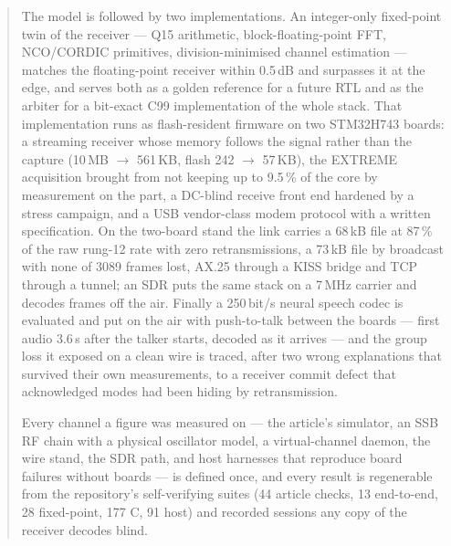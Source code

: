 \documentclass[12pt,a4paper]{article}
\begin{document}
\begin{abstract}
The model is followed by two implementations.  An integer-only
fixed-point twin of the receiver --- Q15 arithmetic,
block-floating-point FFT, NCO/CORDIC primitives, division-minimised
channel estimation --- matches the floating-point receiver within
0.5\,dB and surpasses it at the edge, and serves both as a golden
reference for a future RTL and as the arbiter for a bit-exact C99
implementation of the whole stack.  That implementation runs as
flash-resident firmware on two STM32H743 boards: a streaming receiver
whose memory follows the signal rather than the capture (10\,MB
$\to$ 561\,KB, flash 242 $\to$ 57\,KB), the EXTREME acquisition
brought from not keeping up to 9.5\,\% of the core by measurement on
the part, a DC-blind receive front end hardened by a stress campaign,
and a USB vendor-class modem protocol with a written specification.
On the two-board stand the link carries a 68\,kB file at 87\,\% of the
raw rung-12 rate with zero retransmissions, a 73\,kB file by broadcast
with none of 3089 frames lost, AX.25 through a KISS bridge and TCP
through a tunnel; an SDR puts the same stack on a 7\,MHz carrier and
decodes frames off the air.  Finally a 250\,bit/s neural speech codec
is evaluated and put on the air with push-to-talk between the boards
--- first audio 3.6\,s after the talker starts, decoded as it arrives
--- and the group loss it exposed on a clean wire is traced, after two
wrong explanations that survived their own measurements, to a receiver
commit defect that acknowledged modes had been hiding by
retransmission.

Every channel a figure was measured on --- the article's simulator, an
SSB RF chain with a physical oscillator model, a virtual-channel
daemon, the wire stand, the SDR path, and host harnesses that
reproduce board failures without boards --- is defined once, and every
result is regenerable from the repository's self-verifying suites
(44 article checks, 13 end-to-end, 28 fixed-point, 177 C, 91 host)
and recorded sessions any copy of the receiver decodes blind.
\end{abstract}

\newpage
\tableofcontents
\listoftables
\newpage




\end{document}
